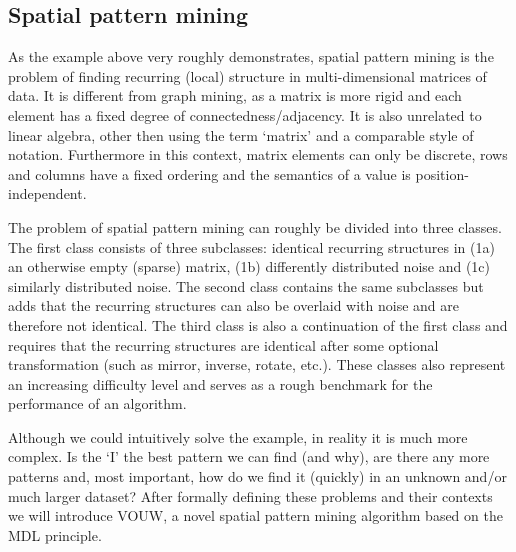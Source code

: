 \documentclass{llncs}
\begin{document}
\subsection{Spatial pattern mining}

As the example above very roughly demonstrates, spatial pattern mining is the problem of finding recurring (local) structure in multi-dimensional matrices of data. It is different from graph mining, as a matrix is more rigid and each element has a fixed degree of connectedness/adjacency. It is also unrelated to linear algebra, other then using the term `matrix' and a comparable style of notation. Furthermore in this context, matrix elements can only be discrete, rows and columns have a fixed ordering and the semantics of a value is position-independent.

The problem of spatial pattern mining can roughly be divided into three classes. The first class consists of three subclasses: identical recurring structures in (1a) an otherwise empty (sparse) matrix, (1b) differently distributed noise and (1c) similarly distributed noise. The second class contains the same subclasses but adds that the recurring structures can also be overlaid with noise and are therefore not identical. The third class is also a continuation of the first class and requires that the recurring structures are identical after some optional transformation (such as mirror, inverse, rotate, etc.). These classes also represent an increasing difficulty level and serves as a rough benchmark for the performance of an algorithm.      

Although we could intuitively solve the example, in reality it is much more complex. Is the `I' the best pattern we can find (and why), are there any more patterns and, most important, how do we find it (quickly) in an unknown and/or much larger dataset? After formally defining these problems and their contexts we will introduce VOUW, a novel spatial pattern mining algorithm based on the MDL principle. 
 
\end{document}
